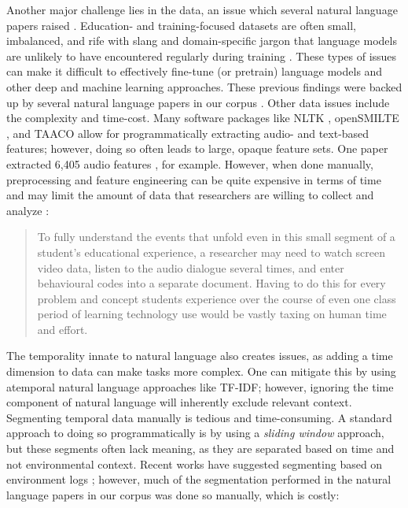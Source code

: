 \documentclass[manuscript,screen,review]{acmart}
\begin{document}
Another major challenge lies in the data, an issue which several natural language papers raised \cite{957160695,3783339081,3796180663}. Education- and training-focused datasets are often small, imbalanced, and rife with slang and domain-specific jargon that language models are unlikely to have encountered regularly during training \cite{cochran2022improving,cochran2023improving,cochran2023bimproving}. These types of issues can make it difficult to effectively fine-tune (or pretrain) language models \cite{cohn2020bert} and other deep and machine learning approaches. These previous findings were backed up by several natural language papers in our corpus \cite{957160695,3796643912,3448122334}. Other data issues include the complexity and time-cost. Many software packages like NLTK \cite{nltk}, openSMILTE \cite{eyben2010opensmile}, and TAACO \cite{crossley2016tool,crossley2019tool} allow for programmatically extracting audio- and text-based features; however, doing so often leads to large, opaque feature sets. One paper extracted 6,405 audio features \cite{3135645357}, for example. However, when done manually, preprocessing and feature engineering can be quite expensive in terms of time and may limit the amount of data that researchers are willing to collect and analyze \cite{32184286}: 

\begin{quote}
     To fully understand the events that unfold even in this small segment of a student's educational experience, a researcher may need to watch screen video data, listen to the audio dialogue several times, and enter behavioural codes into a separate document. Having to do this for every problem and concept students experience over the course of even one class period of learning technology use would be vastly taxing on human time and effort. \cite{3796180663}
\end{quote}

The temporality innate to natural language also creates issues, as adding a time dimension to data can make tasks more complex. One can mitigate this by using atemporal natural language approaches like TF-IDF; however, ignoring the time component of natural language will inherently exclude relevant context. Segmenting temporal data manually is tedious and time-consuming. A standard approach to doing so programmatically is by using a \textit{sliding window} approach, but these segments often lack meaning, as they are separated based on time and not environmental context. Recent works have suggested segmenting based on environment logs \cite{snyder2023using,snyder2023analyzing}; however, much of the segmentation performed in the natural language papers in our corpus was done so manually, which is costly:
\end{document}
